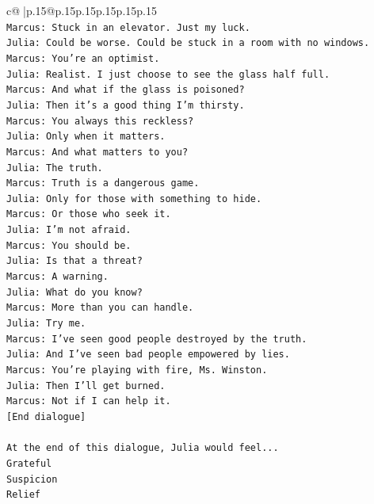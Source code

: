 \documentclass{article}
\begin{document}
{\begin{supertabular}{c@{$\;$}|p{.15\linewidth}@{}p{.15\linewidth}p{.15\linewidth}p{.15\linewidth}p{.15\linewidth}p{.15\linewidth}}
{{{\\ 
\texttt{Marcus: Stuck in an elevator. Just my luck.} \\
\texttt{Julia: Could be worse. Could be stuck in a room with no windows.} \\
\texttt{Marcus: You're an optimist.} \\
\texttt{Julia: Realist. I just choose to see the glass half full.} \\
\texttt{Marcus: And what if the glass is poisoned?} \\
\texttt{Julia: Then it's a good thing I'm thirsty.} \\
\texttt{Marcus: You always this reckless?} \\
\texttt{Julia: Only when it matters.} \\
\texttt{Marcus: And what matters to you?} \\
\texttt{Julia: The truth.} \\
\texttt{Marcus: Truth is a dangerous game.} \\
\texttt{Julia: Only for those with something to hide.} \\
\texttt{Marcus: Or those who seek it.} \\
\texttt{Julia: I'm not afraid.} \\
\texttt{Marcus: You should be.} \\
\texttt{Julia: Is that a threat?} \\
\texttt{Marcus: A warning.} \\
\texttt{Julia: What do you know?} \\
\texttt{Marcus: More than you can handle.} \\
\texttt{Julia: Try me.} \\
\texttt{Marcus: I've seen good people destroyed by the truth.} \\
\texttt{Julia: And I've seen bad people empowered by lies.} \\
\texttt{Marcus: You're playing with fire, Ms. Winston.} \\
\texttt{Julia: Then I'll get burned.} \\
\texttt{Marcus: Not if I can help it.} \\
\texttt{{[}End dialogue{]}} \\
\\ 
\texttt{At the end of this dialogue, Julia would feel...} \\
\texttt{Grateful} \\
\texttt{Suspicion} \\
\texttt{Relief} \\
}}}
\end{supertabular}}
\end{document}
